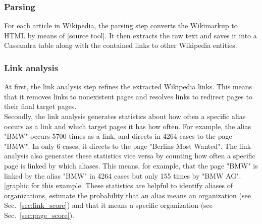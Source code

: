 \subsubsection{Parsing}
For each article in Wikipedia, the parsing step converts the Wikimarkup to HTML by means of [source tool]. It then extracts the raw text and saves it into a Cassandra table along with the contained links to other Wikipedia entities.

\subsubsection{Link analysis}
At first, the link analysis step refines the extracted Wikipedia links. This means that it removes links to nonexistent pages and resolves links to redirect pages to their final target pages.\\
Secondly, the link analysis generates statistics about how often a specific alias occurs as a link and which target pages it has how often. For example, the alias "BMW" occurs 5700 times as a link, and directs in 4264 cases to the page "BMW". In only 6 cases, it directs to the page "Berlins Most Wanted". The link analysis also generates these statistics vice versa by counting how often a specific page is linked by which aliases. This means, for example, that the page "BMW" is linked by the alias "BMW" in 4264 cases but only 155 times by "BMW AG". [graphic for this example] These statistics are helpful to identify aliases of organizations, estimate the probability that an alias means an organization (see Sec.~\ref{sec:link_score}) and that it means a specific organization (see Sec.~\ref{sec:page_score}).\\

